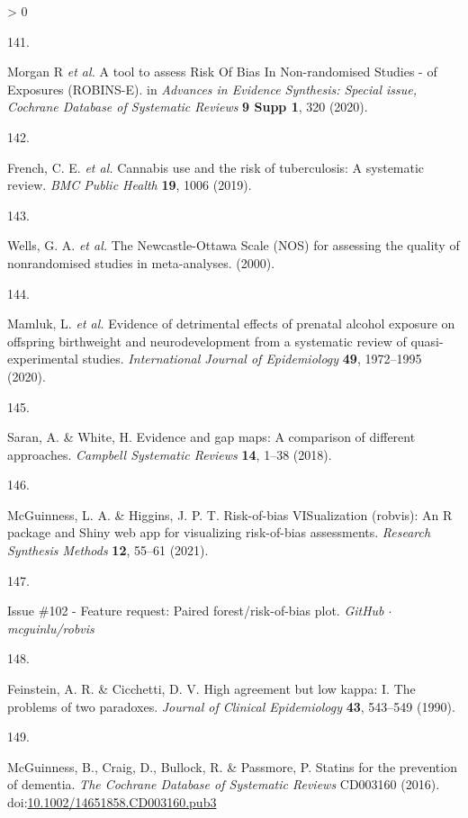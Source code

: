 \documentclass[a4paper, twoside]{templates/ociamthesis}
\newlength{\cslhangindent}
\newlength{\csllabelwidth}
\newenvironment{CSLReferences}[3] %
 {%
  \setlength{\parindent}{0pt}
  \ifodd #1 \everypar{\setlength{\hangindent}{\cslhangindent}}\ignorespaces\fi
  \ifnum #2 > 0
  \setlength{\parskip}{#2\baselineskip}
  \fi
 }%
 {}
\newcommand{\CSLLeftMargin}[1]{\parbox[t]{\maxof{\widthof{#1}}{\csllabelwidth}}{#1}}
\newcommand{\CSLRightInline}[1]{\parbox[t]{\linewidth - \csllabelwidth}{#1}}
\begin{document}
\begin{CSLReferences}{0}{0}
\leavevmode\hypertarget{ref-morganr2020}{}%
\CSLLeftMargin{141. }
\CSLRightInline{Morgan R \emph{et al.} A tool to assess {Risk Of Bias In Non}-randomised {Studies} - of {Exposures} ({ROBINS}-{E}). in \emph{Advances in {Evidence Synthesis}: Special issue, {Cochrane Database} of {Systematic Reviews}} \textbf{9 Supp 1}, 320 (2020).}

\leavevmode\hypertarget{ref-french2019}{}%
\CSLLeftMargin{142. }
\CSLRightInline{French, C. E. \emph{et al.} Cannabis use and the risk of tuberculosis: A systematic review. \emph{BMC Public Health} \textbf{19}, 1006 (2019).}

\leavevmode\hypertarget{ref-wells2000}{}%
\CSLLeftMargin{143. }
\CSLRightInline{Wells, G. A. \emph{et al.} The {Newcastle}-{Ottawa Scale} ({NOS}) for assessing the quality of nonrandomised studies in meta-analyses. (2000).}

\leavevmode\hypertarget{ref-mamluk2020}{}%
\CSLLeftMargin{144. }
\CSLRightInline{Mamluk, L. \emph{et al.} Evidence of detrimental effects of prenatal alcohol exposure on offspring birthweight and neurodevelopment from a systematic review of quasi-experimental studies. \emph{International Journal of Epidemiology} \textbf{49}, 1972--1995 (2020).}

\leavevmode\hypertarget{ref-saran2018}{}%
\CSLLeftMargin{145. }
\CSLRightInline{Saran, A. \& White, H. Evidence and gap maps: A comparison of different approaches. \emph{Campbell Systematic Reviews} \textbf{14}, 1--38 (2018).}

\leavevmode\hypertarget{ref-mcguinness2020robvisPaper}{}%
\CSLLeftMargin{146. }
\CSLRightInline{McGuinness, L. A. \& Higgins, J. P. T. Risk-of-bias {VISualization} (robvis): {An R} package and {Shiny} web app for visualizing risk-of-bias assessments. \emph{Research Synthesis Methods} \textbf{12}, 55--61 (2021).}

\leavevmode\hypertarget{ref-zotero-14999}{}%
\CSLLeftMargin{147. }
\CSLRightInline{Issue \#102 - {Feature} request: Paired forest/risk-of-bias plot. \emph{GitHub {\(\cdot\)} mcguinlu/robvis}}

\leavevmode\hypertarget{ref-feinstein1990}{}%
\CSLLeftMargin{148. }
\CSLRightInline{Feinstein, A. R. \& Cicchetti, D. V. High agreement but low kappa: {I}. {The} problems of two paradoxes. \emph{Journal of Clinical Epidemiology} \textbf{43}, 543--549 (1990).}

\leavevmode\hypertarget{ref-mcguinness2016}{}%
\CSLLeftMargin{149. }
\CSLRightInline{McGuinness, B., Craig, D., Bullock, R. \& Passmore, P. Statins for the prevention of dementia. \emph{The Cochrane Database of Systematic Reviews} CD003160 (2016). doi:\href{https://doi.org/10.1002/14651858.CD003160.pub3}{10.1002/14651858.CD003160.pub3}}


\end{CSLReferences}
\end{document}
